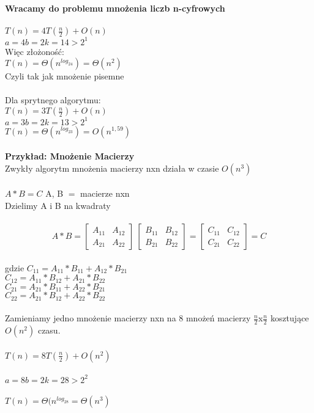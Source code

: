 \textbf{Wracamy do problemu mnożenia liczb n-cyfrowych}\\
\\
\tab $T(n) = 4T(\frac{n}{2}) + O(n)$\\
$a=4$\tab $b=2$\tab $k=1$\tab $4>2^1$\\
Więc złożoność:\\
\tab$T(n) = \Theta(n^{log_24})=\Theta(n^2)$\\
Czyli tak jak mnożenie pisemne\\
\\
Dla sprytnego algorytmu: \\
\tab $T(n) = 3T(\frac{n}{2})+O(n)$\\
$a=3$\tab $b=2$\tab $k=1$\tab $3>2^1$\\
\tab $T(n)= \Theta(n^{log_23})=O(n^{1,59})$\\
\\
\textbf{Przykład: Mnożenie Macierzy}\\
Zwykły algorytm mnożenia macierzy nxn działa w czasie $O(n^3)$\\
\\
$A\ast B=C$ A, B $=$ macierze nxn\\
Dzielimy A i B na kwadraty\\
\\
\[
A\ast B = 
\begin{bmatrix}
    A_{11}       & A_{12} \\
    A_{21}       & A_{22} 
\end{bmatrix}\ 
\begin{bmatrix}
    B_{11}       & B_{12} \\
    B_{21}       & B_{22} 
\end{bmatrix}
=
\begin{bmatrix}
    C_{11}       & C_{12} \\
    C_{21}       & C_{22} 
\end{bmatrix} = C
\]
\\
gdzie $C_{11}= A_{11}\ast B_{11}+A_{12}\ast B_{21}$\\
\tab $C_{12}= A_{11}\ast B_{12}+A_{21}\ast B_{22}$\\
\tab $C_{21}= A_{21}\ast B_{11}+A_{22}\ast B_{21}$\\
\tab $C_{22}= A_{21}\ast B_{12}+A_{22}\ast B_{22}$\\
\\
Zamieniamy jedno mnożenie macierzy nxn na 8 mnożeń macierzy $\frac{n}{2}$x$\frac{n}{2}$ kosztujące $O(n^2)$ czasu.\\
\\
\tab $T(n)=8T( \frac{n}{2} )+ O(n^2)$\\
\\
$a=8$\tab $b=2$\tab $k=2$\tab $8>2^2$\\
\\
\tab $T(n)=\Theta(n^{log_28} = \Theta(n^3)$\\

